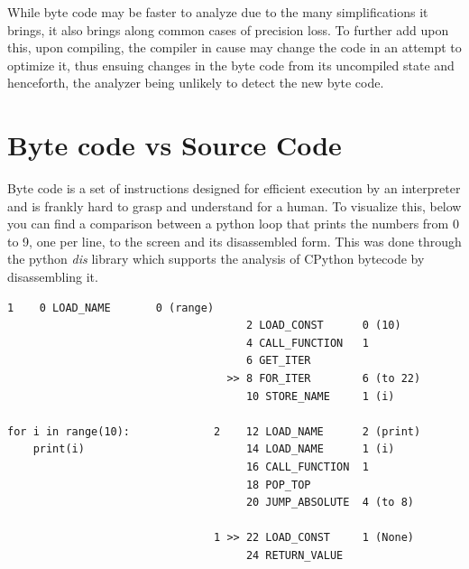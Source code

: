 \noindent While byte code may be faster to analyze \cite{logozzo2008relative} due to the many simplifications it brings, it also brings along common cases of precision loss. To further add upon this, upon compiling, the compiler in cause may change the code in an attempt to optimize it, thus ensuing changes in the byte code from its uncompiled state and henceforth, the analyzer being unlikely to detect the new byte code. 

\section{Byte code vs Source Code}

Byte code is a set of instructions designed for efficient execution by an interpreter and is frankly hard to grasp and understand for a human. To visualize this, below you can find a comparison between a python loop that prints the numbers from 0 to 9, one per line, to the screen and its disassembled form. This was done through the python \textit{dis} library \parencite{disDocs} which  supports the analysis of CPython bytecode by disassembling it. 

%
%
\begin{lstlisting}[caption = Disassembled Python, columns=fixed, basewidth=0.5em, basicstyle={\ttfamily}, frame=lines]
                                1    0 LOAD_NAME       0 (range)
                                     2 LOAD_CONST      0 (10)
                                     4 CALL_FUNCTION   1
                                     6 GET_ITER
                                  >> 8 FOR_ITER        6 (to 22)
                                     10 STORE_NAME     1 (i)

for i in range(10):             2    12 LOAD_NAME      2 (print)
    print(i)                         14 LOAD_NAME      1 (i)
                                     16 CALL_FUNCTION  1
                                     18 POP_TOP
                                     20 JUMP_ABSOLUTE  4 (to 8)

                                1 >> 22 LOAD_CONST     1 (None)
                                     24 RETURN_VALUE
\end{lstlisting}

